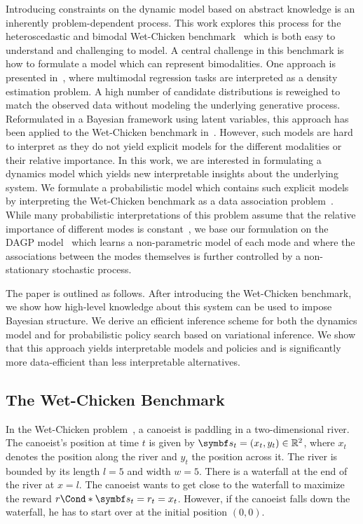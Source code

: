 Introducing constraints on the dynamic model based on abstract knowledge is an inherently problem-dependent process.
This work explores this process for the heteroscedastic and bimodal Wet-Chicken benchmark~\parencite{tresp_wet_1994,hans_efficient_2009} which is both easy to understand and challenging to model.
A central challenge in this benchmark is how to formulate a model which can represent bimodalities.
One approach is presented in~\parencite{bishop_mixture_1994}, where multimodal regression tasks are interpreted as a density estimation problem.
A high number of candidate distributions is reweighed to match the observed data without modeling the underlying generative process.
Reformulated in a Bayesian framework using latent variables, this approach has been applied to the Wet-Chicken benchmark in~\parencite{depeweg_learning_2016,depeweg_decomposition_2018}.
However, such models are hard to interpret as they do not yield explicit models for the different modalities or their relative importance.
In this work, we are interested in formulating a dynamics model which yields new interpretable insights about the underlying system.
We formulate a probabilistic model which contains such explicit models by interpreting the Wet-Chicken benchmark as a data association problem~\parencite{barshalom_tracking_1990,cox_review_1993}.
While many probabilistic interpretations of this problem assume that the relative importance of different modes is constant~\parencite{lazaro-gredilla_overlapping_2012,bodin_latent_2017}, we base our formulation on the DAGP model~\parencite{kaiser_data_2018} which learns a non-parametric model of each mode and where the associations between the modes themselves is further controlled by a non-stationary stochastic process.

The paper is outlined as follows.
After introducing the Wet-Chicken benchmark, we show how high-level knowledge about this system can be used to impose Bayesian structure.
We derive an efficient inference scheme for both the dynamics model and for probabilistic policy search based on variational inference.
We show that this approach yields interpretable models and policies and is significantly more data-efficient than less interpretable alternatives.


\subsection{The Wet-Chicken Benchmark}
\label{sub:interpretable_reinforcement_learning:wetchicken}
In the Wet-Chicken problem~\parencite{tresp_wet_1994,hans_efficient_2009}, a canoeist is paddling in a two-dimensional river.
The canoeist's position at time $t$ is given by $\mat{s}_t = (x_t, y_t) \in \Rb^2$, where $x_t$ denotes the position along the river and $y_t$ the position across it.
The river is bounded by its length $l = 5$ and width $w = 5$.
There is a waterfall at the end of the river at $x = l$.
The canoeist wants to get close to the waterfall to maximize the reward $\Fun*{r}{\mat{s}_t} = r_t = x_t$.
However, if the canoeist falls down the waterfall, he has to start over at the initial position $(0, 0)$.

